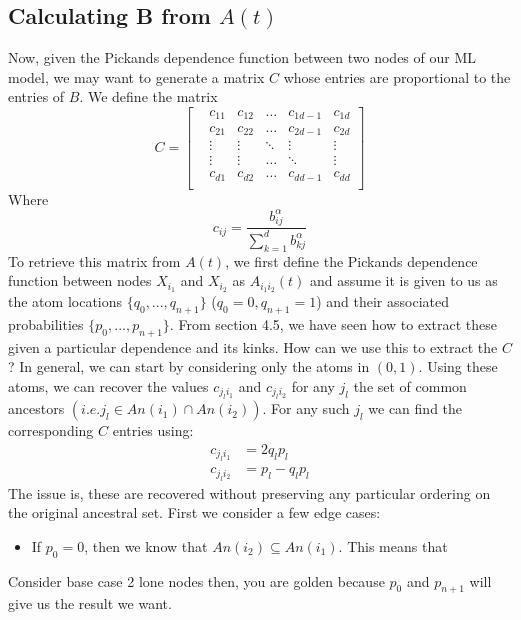 \documentclass[12pt]{article}
\theoremstyle{definition}
\theoremstyle{definition}
\begin{document}
\subsection{Calculating B from $A(t)$}
Now, given the Pickands dependence function between two nodes of our ML model, we may want to generate a matrix $C$ whose entries are proportional to the entries of $B$. We define the matrix
\[ C=\begin{bmatrix}
&c_{11} &c_{12}&\hdots& c_{1d-1}& c_{1d}\\
&c_{21} &c_{22}&\hdots& c_{2d-1}& c_{2d}\\
&\vdots&\vdots&\ddots & \vdots& \vdots \\
&\vdots&\vdots&\hdots & \ddots& \vdots \\
&c_{d1}& c_{d2} & \hdots &c_{dd-1}& c_{dd}\\
\end{bmatrix}
\]
Where  $$c_{ij}=\frac{b^\alpha_{ij}}{\sum_{k=1}^db_{kj}^\alpha}$$
To retrieve this matrix from $A(t)$, we first define the Pickands dependence function between nodes $X_{i_1}$ and $X_{i_2}$ as $A_{i_1i_2}(t)$ and assume it is given to us as the atom locations $\{q_0,...,q_{n+1}\}$ ($q_0=0, q_{n+1}=1$) and their associated probabilities $\{p_0,...,p_{n+1}\}$. From section 4.5, we have seen how to extract these given a particular dependence and its kinks. How can we use this to extract the $C$? In general, we can start by considering only the atoms in $(0,1)$. Using these atoms, we can recover the values $c_{j_li_1}$ and $c_{j_li_2}$ for any $j_l$ the set of common ancestors $(i.e. j_l \in An(i_1)\cap An(i_2))$. For any such $j_l$ we can find the corresponding $C$ entries using:
\begin{align*}
    c_{j_li_1}&=2q_lp_l\\
    c_{j_li_2}&=p_l-q_lp_l
\end{align*}
The issue is, these are recovered without preserving any particular ordering on the original ancestral set. 
First we consider a few edge cases:
\begin{itemize}
    \item If $p_0=0$, then we know that $An(i_2)\subseteq An(i_1)$. This means that 
\end{itemize}
Consider base case 2 lone nodes 
then, you are golden because $p_0$ and $p_{n+1}$ will give us the result we want.









 
\end{document}
